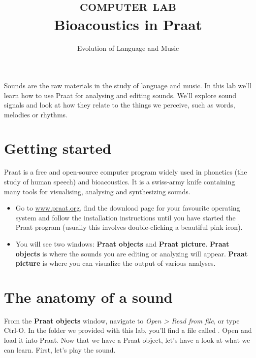 \documentclass[a4paper, 9pt]{article}
\title{\textsc{computer lab}\\ \textbf{Bioacoustics in Praat}}
\author{Evolution of Language and Music}
\date{}
\begin{document}
\maketitle
{}

\begin{goals}
Sounds are the raw materials in the study of language and music. In this
lab we'll learn how to use Praat for analysing and editing sounds. We'll
explore sound signals and look at how they relate to the things we
perceive, such as words, melodies or rhythms.
\end{goals}

\section{Getting started}\label{getting-started}

Praat is a free and open-source computer program widely used in
phonetics (the study of human speech) and bioacoustics. It is a
swiss-army knife containing many tools for visualising, analysing and
synthesizing sounds.\\

\begin{itemize}
	\item Go to \url{www.praat.org}, find the download page for your favourite operating system and follow the installation instructions until you have started the Praat program (usually this involves double-clicking a beautiful pink icon).
  	\item You will see two windows: \textbf{Praat objects} and \textbf{Praat
  	picture}. \textbf{Praat objects} is where the sounds you are editing or
  	analyzing will appear. \textbf{Praat picture} is where you can visualize
  	the output of various analyses.
\end{itemize}
  

\section{The anatomy of a sound}\label{the-anatomy-of-a-sound}

From the \textbf{Praat objects} window, navigate to \emph{Open > Read from file}, or type Ctrl-O. In the  folder we provided with this lab, you'll find a file called . Open and load it into Praat. Now that we have a Praat object, let's have a look at what we can learn. First, let's play the sound.
\end{document}
